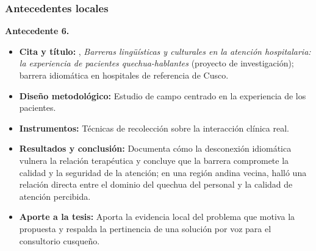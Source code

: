 \subsubsection{Antecedentes locales}
\begin{bloqueObsDos}
\noindent\textbf{Antecedente 6.}
\begin{itemize}\setlength{\itemsep}{1pt}
  \item \textbf{Cita y t{\'i}tulo:} \textcite{begazo2026}, \emph{Barreras ling{\"u}{\'i}sticas y culturales en la atenci{\'o}n hospitalaria: la experiencia de pacientes quechua-hablantes} (proyecto de investigaci{\'o}n); barrera idiom{\'a}tica en hospitales de referencia de Cusco.
  \item \textbf{Dise{\~n}o metodol{\'o}gico:} Estudio de campo centrado en la experiencia de los pacientes.
  \item \textbf{Instrumentos:} T{\'e}cnicas de recolecci{\'o}n sobre la interacci{\'o}n cl{\'i}nica real.
  \item \textbf{Resultados y conclusi{\'o}n:} Documenta c{\'o}mo la desconexi{\'o}n idiom{\'a}tica vulnera la relaci{\'o}n terap{\'e}utica y concluye que la barrera compromete la calidad y la seguridad de la atenci{\'o}n; en una regi{\'o}n andina vecina, \textcite{cuaila2022} hall{\'o} una relaci{\'o}n directa entre el dominio del quechua del personal y la calidad de atenci{\'o}n percibida.
  \item \textbf{Aporte a la tesis:} Aporta la evidencia local del problema que motiva la propuesta y respalda la pertinencia de una soluci{\'o}n por voz para el consultorio cusque{\~n}o.
\end{itemize}


\end{bloqueObsDos}
